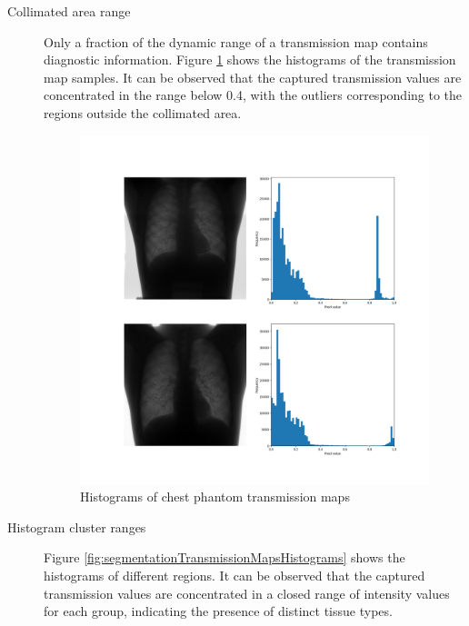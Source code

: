 \documentclass[nomenclature, english, bibtex]{kththesis}
\numberwithin{listing}{chapter}
\begin{document}
\begin{description}
    \item[Collimated area range] Only a fraction of the dynamic range of a transmission map
   contains diagnostic information. Figure \ref{fig:transmissionMapsHistograms} shows the histograms
   of the transmission map samples. It can be observed that the captured transmission values are concentrated in
  the range below 0.4, with the outliers corresponding to the regions outside the collimated area. 
    \begin{figure}
        \centering
        \includegraphics[width=1.0\textwidth]{figures/transmission_maps_histograms.png}
        \caption{Histograms of chest phantom transmission maps}
        \label{fig:transmissionMapsHistograms}
    \end{figure}
    \item[Histogram cluster ranges] Figure \ref{fig:segmentationTransmissionMapsHistograms} shows the histograms
    of different regions. It can be observed that the captured transmission values are concentrated in a closed
    range of intensity values for each group, indicating the presence of distinct tissue types.


\end{description}
\end{document}
